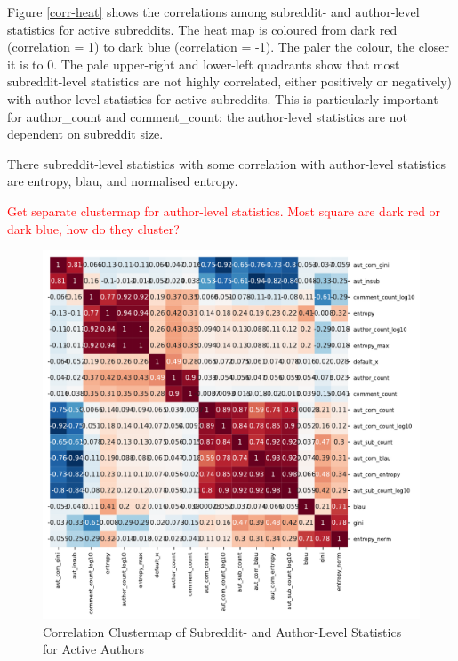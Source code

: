 Figure \ref{corr-heat} shows the correlations among subreddit- and author-level statistics for active subreddits. The heat map is coloured from dark red (correlation = 1) to dark blue (correlation = -1). The paler the colour, the closer it is to 0. The pale upper-right and lower-left quadrants show that most subreddit-level statistics are not highly correlated, either positively or negatively) with author-level statistics for active subreddits. This is particularly important for author\_count and comment\_count: the author-level statistics are not dependent on subreddit size.

There subreddit-level statistics with some correlation with author-level statistics are entropy, blau, and normalised entropy.

\textcolor{red}{Get separate clustermap for author-level statistics. Most square are dark red or dark blue, how do they cluster?}


\begin{figure}
    \includegraphics[scale=0.8]{latex/matrix/corr-cluster-active.pdf}
    \caption{Correlation Clustermap of Subreddit- and Author-Level Statistics for Active Authors}
    \label{corr-cluster}
\end{figure}
